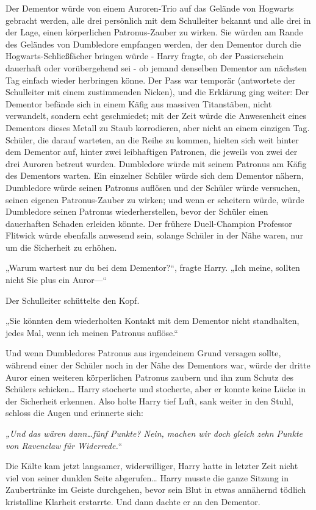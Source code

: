 {Der Dementor würde von einem Auroren-Trio auf das Gelände von Hogwarts gebracht werden, alle drei persönlich mit dem Schulleiter bekannt und alle drei in der Lage, einen körperlichen Patronus-Zauber zu wirken. Sie würden am Rande des Geländes von Dumbledore empfangen werden, der den Dementor durch die Hogwarts-Schließfächer bringen würde - Harry fragte, ob der Passierschein dauerhaft oder vorübergehend sei - ob jemand denselben Dementor am nächsten Tag einfach wieder herbringen könne. Der Pass war temporär (antwortete der Schulleiter mit einem zustimmenden Nicken), und die Erklärung ging weiter: Der Dementor befände sich in einem Käfig aus massiven Titanstäben, nicht verwandelt, sondern echt geschmiedet; mit der Zeit würde die Anwesenheit eines Dementors dieses Metall zu Staub korrodieren, aber nicht an einem einzigen Tag. Schüler, die darauf warteten, an die Reihe zu kommen, hielten sich weit hinter dem Dementor auf, hinter zwei leibhaftigen Patronen, die jeweils von zwei der drei Auroren betreut wurden. Dumbledore würde mit seinem Patronus am Käfig des Dementors warten. Ein einzelner Schüler würde sich dem Dementor nähern, Dumbledore würde seinen Patronus auflösen und der Schüler würde versuchen, seinen eigenen Patronus-Zauber zu wirken; und wenn er scheitern würde, würde Dumbledore seinen Patronus wiederherstellen, bevor der Schüler einen dauerhaften Schaden erleiden könnte. Der frühere Duell-Champion Professor Flitwick würde ebenfalls anwesend sein, solange Schüler in der Nähe waren, nur um die Sicherheit zu erhöhen.

„Warum wartest nur du bei dem Dementor?“, fragte Harry. „Ich meine, sollten nicht Sie plus ein Auror—“

Der Schulleiter schüttelte den Kopf.

„Sie könnten dem wiederholten Kontakt mit dem Dementor nicht standhalten, jedes Mal, wenn ich meinen Patronus auflöse.“

Und wenn Dumbledores Patronus aus irgendeinem Grund versagen sollte, während einer der Schüler noch in der Nähe des Dementors war, würde der dritte Auror einen weiteren körperlichen Patronus zaubern und ihn zum Schutz des Schülers schicken… Harry stocherte und stocherte, aber er konnte keine Lücke in der Sicherheit erkennen. Also holte Harry tief Luft, sank weiter in den Stuhl, schloss die Augen und erinnerte sich:

\emph{„Und das wären dann…fünf Punkte? Nein, machen wir doch gleich zehn Punkte von Ravenclaw für Widerrede.}“

Die Kälte kam jetzt langsamer, widerwilliger, Harry hatte in letzter Zeit nicht viel von seiner dunklen Seite abgerufen… Harry musste die ganze Sitzung in Zaubertränke im Geiste durchgehen, bevor sein Blut in etwas annähernd tödlich kristalline Klarheit erstarrte. Und dann dachte er an den Dementor.

}
